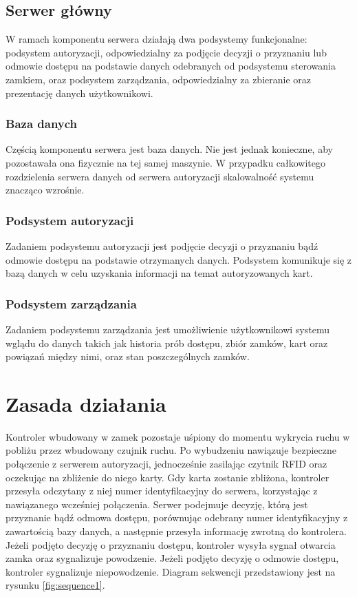                 \subsection{Serwer główny}
                        W ramach komponentu serwera działają dwa podsystemy funkcjonalne: podsystem autoryzacji, odpowiedzialny za podjęcie decyzji o przyznaniu lub odmowie dostępu na podstawie danych odebranych od podsystemu sterowania zamkiem, oraz podsystem zarządzania, odpowiedzialny za zbieranie oraz prezentację danych użytkownikowi.

                \subsubsection{Baza danych}
                        Częścią komponentu serwera jest baza danych. Nie jest jednak konieczne, aby pozostawała ona fizycznie na tej samej maszynie. W przypadku całkowitego rozdzielenia serwera danych od serwera autoryzacji skalowalność systemu znacząco wzrośnie.

                \subsubsection{Podsystem autoryzacji}
                        Zadaniem podsystemu autoryzacji jest podjęcie decyzji o przyznaniu bądź odmowie dostępu na podstawie otrzymanych danych. Podsystem komunikuje się z bazą danych w celu uzyskania informacji na temat autoryzowanych kart.

                \subsubsection{Podsystem zarządzania}
                        Zadaniem podsystemu zarządzania jest umożliwienie użytkownikowi systemu wglądu do danych takich jak historia prób dostępu, zbiór zamków, kart oraz powiązań między nimi, oraz stan poszczególnych zamków.

        \section{Zasada działania}
                Kontroler wbudowany w zamek pozostaje uśpiony do momentu wykrycia ruchu w pobliżu przez wbudowany czujnik ruchu. Po wybudzeniu nawiązuje bezpieczne połączenie z serwerem autoryzacji, jednocześnie zasilając czytnik RFID oraz oczekując na zbliżenie do niego karty. Gdy karta zostanie zbliżona, kontroler przesyła odczytany z niej numer identyfikacyjny do serwera, korzystając z nawiązanego wcześniej połączenia. Serwer podejmuje decyzję, którą jest przyznanie bądź odmowa dostępu, porównując odebrany numer identyfikacyjny z zawartością bazy danych, a następnie przesyła informację zwrotną do kontrolera. Jeżeli podjęto decyzję o przyznaniu dostępu, kontroler wysyła sygnał otwarcia zamka oraz sygnalizuje powodzenie. Jeżeli podjęto decyzję o odmowie dostępu, kontroler sygnalizuje niepowodzenie. Diagram sekwencji przedstawiony jest na rysunku \ref{fig:sequence1}.

